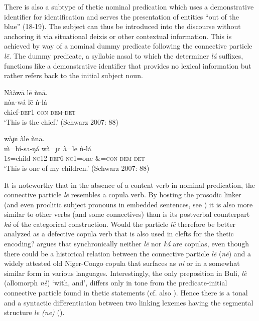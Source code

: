 \documentclass[output=paper]{langsci/langscibook}
\begin{document}
There is also a subtype of thetic nominal predication which uses a demonstrative identifier for identification and serves the presentation of entities “out of the blue” (18-19). The subject can thus be introduced into the discourse without anchoring it via situational deixis or other contextual information. This is achieved by way of a nominal dummy predicate following the connective particle \textit{l\={e}.} The dummy predicate, a syllabic nasal to which the determiner \textit{lá} suffixes, functions like a demonstrative identifier that provides no lexical information but rather refers back to the initial subject noun.

\ea\label{ex:schwarz:18}
\glll   Nààw\={a}    l\={e}  ǹn\={a}.\\
    \textup{nàa-wá}    l\={e}  {ǹ-lá}\\
       chief-\textsc{def1}  \textsc{con}  \textsc{dem}-\textsc{det}\\
\glt ‘This is the chief.’ (Schwarz 2007: 88)
\z

\ea\label{ex:schwarz:19}
    wàɲ\={i}    àl\={e}    ǹn\={a}.\\
    \textup{\`{m}=bí-sa-ŋá}    wà=ɲ\={i}    à=l\={e}    {ǹ-lá}\\
       1\textsc{s}=child-\textsc{nc}12-\textsc{def}6  \textsc{nc}1=one  \&=\textsc{con}  \textsc{dem-det}\\
\glt ‘This is one of my children.’ (Schwarz 2007: 88)
\z

It is noteworthy that in the absence of a content verb in nominal predication, the connective particle \textit{l\={e}} resembles a copula verb. By hosting the prosodic linker (and even proclitic subject pronouns in embedded sentences, see ) it is also more similar to other verbs (and some connectives) than is its postverbal counterpart \textit{ká} of the categorical construction. Would the particle \textit{l\={e}} therefore be better analyzed as a defective copula verb that is also used in clefts for the thetic encoding? \citet{Schwarz2009tonal} argues that synchronically neither \textit{l\={e}} nor \textit{ká} are copulas, even though there could be a historical relation between the connective particle \textit{l\={e}} (\textit{n\={e}}) and a widely attested old Niger-Congo copula that surfaces as \textit{ni} or in a somewhat similar form in various languages. Interestingly, the only preposition in Buli, \textit{lè} (allomorph \textit{nè}) ‘with, and’, differs only in tone from the predicate-initial connective particle found in thetic statements (cf. also \citealt{Schwarz2010a}). Hence there is a tonal and a syntactic differentiation between two linking lexemes having the segmental structure \textit{le (ne)} ().
\end{document}
